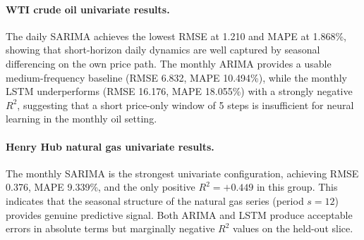 \documentclass[12pt,a4paper]{article}
\begin{document}
\begin{table}[H]
\centering
\caption{Selected univariate model outputs. Metrics are reported on the test slice. Configurations are included only where stored metric artefacts are available.}\label{tab:uni-results}
\small
{}
\end{table}

\paragraph{WTI crude oil univariate results.} The daily SARIMA achieves the lowest RMSE at 1.210 and MAPE at 1.868\%, showing that short-horizon daily dynamics are well captured by seasonal differencing on the own price path. The monthly ARIMA provides a usable medium-frequency baseline (RMSE 6.832, MAPE 10.494\%), while the monthly LSTM underperforms (RMSE 16.176, MAPE 18.055\%) with a strongly negative $R^2$, suggesting that a short price-only window of 5 steps is insufficient for neural learning in the monthly oil setting.

\paragraph{Henry Hub natural gas univariate results.} The monthly SARIMA is the strongest univariate configuration, achieving RMSE 0.376, MAPE 9.339\%, and the only positive $R^2 = +0.449$ in this group. This indicates that the seasonal structure of the natural gas series (period $s=12$) provides genuine predictive signal. Both ARIMA and LSTM produce acceptable errors in absolute terms but marginally negative $R^2$ values on the held-out slice.
\end{document}
